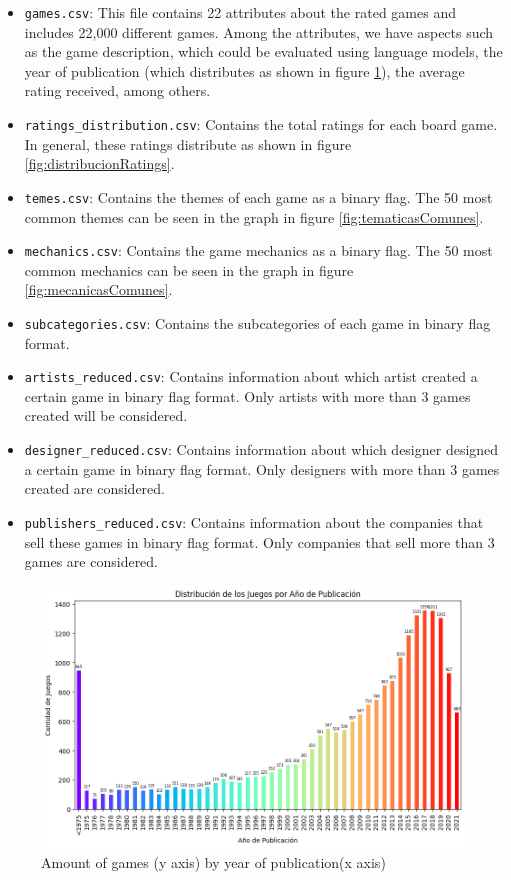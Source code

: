 \documentclass{article}
\begin{document}
\begin{itemize}
    \item \texttt{games.csv}: This file contains 22 attributes about the rated games and includes 22,000 different games. Among the attributes, we have aspects such as the game description, which could be evaluated using language models, the year of publication (which distributes as shown in figure \ref{fig:publishYear}), the average rating received, among others.
    \item \texttt{ratings\_distribution.csv}: Contains the total ratings for each board game. In general, these ratings distribute as shown in figure \ref{fig:distribucionRatings}.
    \item \texttt{temes.csv}: Contains the themes of each game as a binary flag. The 50 most common themes can be seen in the graph in figure \ref{fig:tematicasComunes}.
    \item \texttt{mechanics.csv}: Contains the game mechanics as a binary flag. The 50 most common mechanics can be seen in the graph in figure \ref{fig:mecanicasComunes}.
    \item \texttt{subcategories.csv}: Contains the subcategories of each game in binary flag format.
    \item \texttt{artists\_reduced.csv}: Contains information about which artist created a certain game in binary flag format. Only artists with more than 3 games created will be considered.
    \item \texttt{designer\_reduced.csv}: Contains information about which designer designed a certain game in binary flag format. Only designers with more than 3 games created are considered.
    \item \texttt{publishers\_reduced.csv}: Contains information about the companies that sell these games in binary flag format. Only companies that sell more than 3 games are considered.
          
\end{itemize}

\begin{figure}
    \centering
    \includegraphics[width=0.8\linewidth]{publishYear.png}
    \caption{Amount of games (y axis) by year of publication(x axis)}
    \label{fig:publishYear}
\end{figure}
\end{document}
